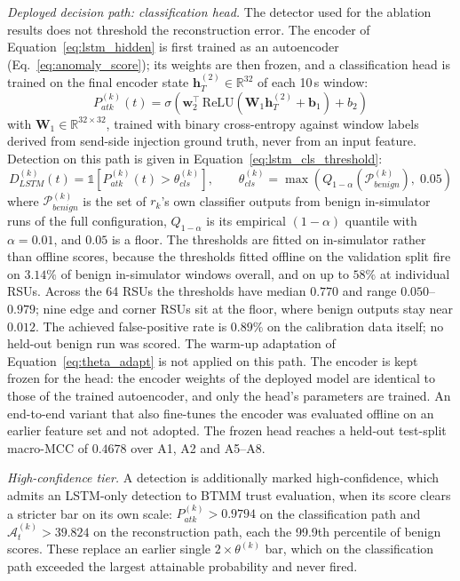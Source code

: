 \documentclass[12pt, a4paper]{report}
\begin{document}
\textit{Deployed decision path: classification head.} The detector
used for the ablation results does not threshold the reconstruction
error. The encoder of Equation~\eqref{eq:lstm_hidden} is first
trained as an autoencoder (Eq.~\ref{eq:anomaly_score}); its weights
are then frozen, and a classification head is trained on the final
encoder state $\mathbf{h}^{(2)}_T \in \mathbb{R}^{32}$ of each 10\,s
window:
\begin{equation}
P_{atk}^{(k)}(t) =
\sigma\!\left(\mathbf{w}_2^{\top}\,
\mathrm{ReLU}\!\left(\mathbf{W}_1 \mathbf{h}^{(2)}_T + \mathbf{b}_1\right)
+ b_2\right)
\label{eq:lstm_cls}
\end{equation}
with $\mathbf{W}_1 \in \mathbb{R}^{32\times 32}$, trained with binary
cross-entropy against window labels derived from send-side injection
ground truth, never from an input feature. Detection on this path is
given in Equation~\eqref{eq:lstm_cls_threshold}:
\begin{equation}
D_{LSTM}^{(k)}(t) = \mathbb{1}\!\left[P_{atk}^{(k)}(t) > \theta_{cls}^{(k)}\right],
\qquad
\theta_{cls}^{(k)} = \max\!\left(
Q_{1-\alpha}\!\left(\mathcal{P}^{(k)}_{benign}\right),\; 0.05\right)
\label{eq:lstm_cls_threshold}
\end{equation}
where $\mathcal{P}^{(k)}_{benign}$ is the set of $r_k$'s own
classifier outputs from benign in-simulator runs of the full
configuration, $Q_{1-\alpha}$ is its empirical $(1-\alpha)$ quantile
with $\alpha = 0.01$, and $0.05$ is a floor. The thresholds are
fitted on in-simulator rather than offline scores, because the
thresholds fitted offline on the validation split fire on $3.14\%$ of
benign in-simulator windows overall, and on up to $58\%$ at individual
\ac{RSU}s. Across the 64 \ac{RSU}s the thresholds have
median $0.770$ and range $0.050$--$0.979$; nine edge and corner
\ac{RSU}s sit at the floor, where benign outputs stay near $0.012$.
The achieved false-positive rate is $0.89\%$ on the calibration data
itself; no held-out benign run was scored. The warm-up adaptation of
Equation~\eqref{eq:theta_adapt} is not applied on this path. The
encoder is kept frozen for the head: the encoder weights of the
deployed model are identical to those of the trained autoencoder, and
only the head's parameters are trained. An end-to-end variant that
also fine-tunes the encoder was evaluated offline on an earlier feature
set and not adopted. The frozen head reaches a held-out test-split
macro-MCC of $0.4678$ over A1, A2 and A5--A8.

\textit{High-confidence tier.} A detection is additionally marked
high-confidence, which admits an \ac{LSTM}-only detection to BTMM
trust evaluation, when its score clears a stricter bar on its own
scale: $P_{atk}^{(k)} > 0.9794$ on the classification path and
$\mathcal{A}_t^{(k)} > 39.824$ on the reconstruction path, each the
99.9th percentile of benign scores. These replace an earlier single
$2\times\theta^{(k)}$ bar, which on the classification path exceeded
the largest attainable probability and never fired.
\end{document}
